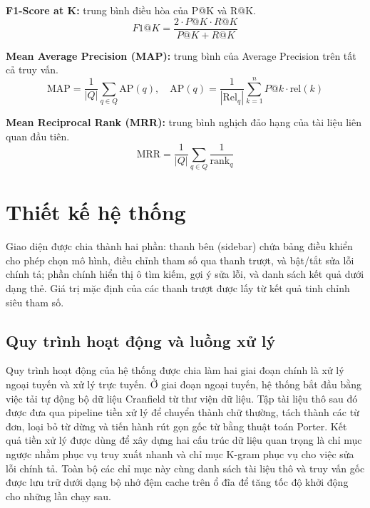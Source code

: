 \documentclass[12pt,a4paper,twoside]{article}
\begin{document}
\textbf{F1-Score at K:} trung bình điều hòa của P@K và R@K.
\begin{equation}
F1@K = \frac{2 \cdot P@K \cdot R@K}{P@K + R@K}
\end{equation}

\textbf{Mean Average Precision (MAP):} trung bình của Average Precision trên tất cả truy vấn.
\begin{equation}
\text{MAP} = \frac{1}{|Q|} \sum_{q \in Q} \text{AP}(q), \quad \text{AP}(q) = \frac{1}{|\text{Rel}_q|} \sum_{k=1}^{n} P@k \cdot \text{rel}(k)
\end{equation}

\textbf{Mean Reciprocal Rank (MRR):} trung bình nghịch đảo hạng của tài liệu liên quan đầu tiên.
\begin{equation}
\text{MRR} = \frac{1}{|Q|} \sum_{q \in Q} \frac{1}{\text{rank}_q}
\end{equation}

\section{Thiết kế hệ thống}


Giao diện được chia thành hai phần: thanh bên (sidebar) chứa bảng điều khiển cho phép chọn mô hình, điều chỉnh tham số qua thanh trượt, và bật/tắt sửa lỗi chính tả; phần chính hiển thị ô tìm kiếm, gợi ý sửa lỗi, và danh sách kết quả dưới dạng thẻ. Giá trị mặc định của các thanh trượt được lấy từ kết quả tinh chỉnh siêu tham số.

\subsection{Quy trình hoạt động và luồng xử lý}

Quy trình hoạt động của hệ thống được chia làm hai giai đoạn chính là xử lý ngoại tuyến và xử lý trực tuyến. Ở giai đoạn ngoại tuyến, hệ thống bắt đầu bằng việc tải tự động bộ dữ liệu Cranfield từ thư viện dữ liệu. Tập tài liệu thô sau đó được đưa qua pipeline tiền xử lý để chuyển thành chữ thường, tách thành các từ đơn, loại bỏ từ dừng và tiến hành rút gọn gốc từ bằng thuật toán Porter. Kết quả tiền xử lý được dùng để xây dựng hai cấu trúc dữ liệu quan trọng là chỉ mục ngược nhằm phục vụ truy xuất nhanh và chỉ mục K-gram phục vụ cho việc sửa lỗi chính tả. Toàn bộ các chỉ mục này cùng danh sách tài liệu thô và truy vấn gốc được lưu trữ dưới dạng bộ nhớ đệm cache trên ổ đĩa để tăng tốc độ khởi động cho những lần chạy sau.
\end{document}
